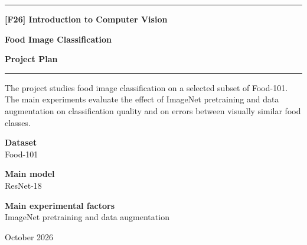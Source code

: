 \documentclass[11pt,a4paper]{article}
\begin{document}

\begin{titlepage}

\thispagestyle{empty}

\vspace*{2.2cm}

{\color{accent}\rule{\textwidth}{1.5pt}}

\vspace{1.1cm}

{\Large\color{textgray}\textbf{[F26] Introduction to Computer Vision}}

\vspace{0.8cm}

{\Huge\textbf{Food Image Classification}}

\vspace{0.45cm}

{\LARGE\color{accent}\textbf{Project Plan}}

\vspace{1cm}

{\color{lightgray}\rule{\textwidth}{0.8pt}}

\vspace{1.4cm}

{\large
The project studies food image classification on a selected subset of Food-101.
The main experiments evaluate the effect of ImageNet pretraining and data augmentation
on classification quality and on errors between visually similar food classes.
}

\vfill

{\large\textbf{Dataset}}\\
Food-101

\vspace{0.5cm}

{\large\textbf{Main model}}\\
ResNet-18

\vspace{0.5cm}

{\large\textbf{Main experimental factors}}\\
ImageNet pretraining and data augmentation

\vfill

{\color{textgray}October 2026}

\end{titlepage}

\setcounter{page}{1}

\end{document}
